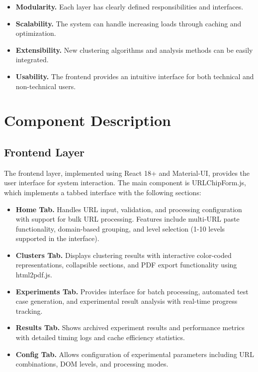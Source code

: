 \begin{itemize}
\item \textbf{Modularity.} Each layer has clearly defined responsibilities and interfaces.
\item \textbf{Scalability.} The system can handle increasing loads through caching and optimization.
\item \textbf{Extensibility.} New clustering algorithms and analysis methods can be easily integrated.
\item \textbf{Usability.} The frontend provides an intuitive interface for both technical and non-technical users.
\end{itemize}

\section{Component Description}
\label{sec:component_description}

\subsection{Frontend Layer}

The frontend layer, implemented using React 18+ and Material-UI, provides the user interface for system interaction. The main component is URLChipForm.js, which implements a tabbed interface with the following sections:

\begin{itemize}
\item \textbf{Home Tab.} Handles URL input, validation, and processing configuration with support for bulk URL processing. Features include multi-URL paste functionality, domain-based grouping, and level selection (1-10 levels supported in the interface).
\item \textbf{Clusters Tab.} Displays clustering results with interactive color-coded representations, collapsible sections, and PDF export functionality using html2pdf.js.
\item \textbf{Experiments Tab.} Provides interface for batch processing, automated test case generation, and experimental result analysis with real-time progress tracking.
\item \textbf{Results Tab.} Shows archived experiment results and performance metrics with detailed timing logs and cache efficiency statistics.
\item \textbf{Config Tab.} Allows configuration of experimental parameters including URL combinations, DOM levels, and processing modes.
\end{itemize}

